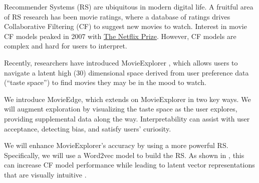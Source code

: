 Recommender Systems (RS) are ubiquitous in modern digital life. A fruitful area of RS research has been movie ratings, where a database of ratings drives Collaborative Filtering (CF) to suggest new movies to watch. Interest in movie CF models peaked in 2007 with \href{https://www.netflixprize.com/}{The Netflix Prize}. However, CF models are complex and hard for users to interpret.

Recently, researchers have introduced MovieExplorer \cite{taijala2018movieexplorer}, which allows users to navigate a latent high (30) dimensional space derived from user preference data (“taste space”) to find movies they may be in the mood to watch. 

We introduce MovieEdge, which extends on MovieExplorer in two key ways.  We will augment exploration by visualizing the taste space as the user explores, providing supplemental data along the way. Interpretability  \cite{Molnar2019interpretable} can assist with user acceptance, detecting bias, and satisfy users’ curiosity. 

We will enhance MovieExplorer’s accuracy  by using a more powerful RS. Specifically, we will use a Word2vec model \cite{mikolov2013distributed} to build the RS. As shown in \cite{ozsoy2016word}, this can increase CF model performance while leading to latent vector representations that are visually intuitive \cite{mikolov2013distributed}. 